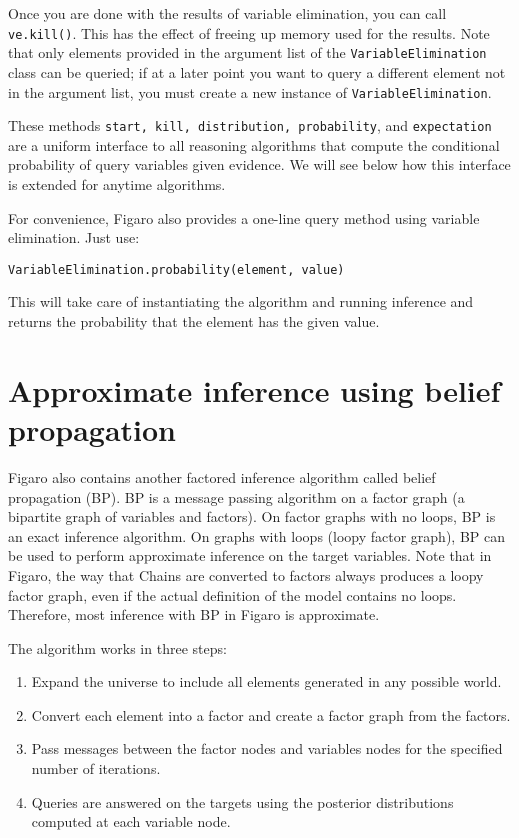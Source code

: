 Once you are done with the results of variable elimination, you can call \texttt{ve.kill()}. This has the effect of freeing up memory used for the results. Note that only elements provided in the argument list of the \texttt{VariableElimination} class can be queried; if at a later point you want to query a different element not in the argument list, you must create a new instance of \texttt{VariableElimination}. 

These methods \texttt{start, kill,  distribution, probability}, and \texttt{ex\-pectation} are a uniform interface to all reasoning algorithms that compute the conditional probability of query variables given evidence. We will see below how this interface is extended for anytime algorithms.

For convenience, Figaro also provides a one-line query method using variable elimination. Just use:

\texttt{VariableElimination.probability(element, value)}

This will take care of instantiating the algorithm and running inference and returns the probability that the element has the given value.

\section{Approximate inference using belief propagation}

Figaro also contains another factored inference algorithm called belief propagation (BP). BP is a message passing algorithm on a factor graph (a bipartite graph of variables and factors). On factor graphs with no loops, BP is an exact inference algorithm. On graphs with loops (loopy factor graph), BP can be used to perform approximate inference on the target variables. Note that in Figaro, the way that Chains are converted to factors always produces a loopy factor graph, even if the actual definition of the model contains no loops. Therefore, most inference with BP in Figaro is approximate.

The algorithm works in three steps:
\begin{enumerate}
\item Expand the universe to include all elements generated in any possible world.
\item Convert each element into a factor and create a factor graph from the factors.
\item Pass messages between the factor nodes and variables nodes for the specified number of iterations.
\item Queries are answered on the targets using the posterior distributions computed at each variable node.
\end{enumerate}

